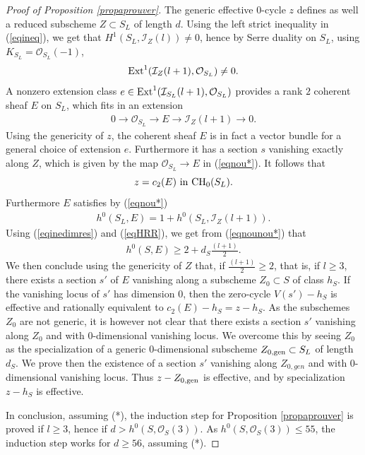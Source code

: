 \documentclass[10pt]{article}
\begin{document}
\begin{proof}[Proof of Proposition \ref{propaprouver}]
The generic effective $0$-cycle $z$ defines as well a reduced subscheme
$Z\subset S_L$ of length $d$. Using the left strict inequality in (\ref{eqineq}), we get that $H^1(S_L,\mathcal{I}_Z(l))\not=0$, hence by Serre duality on $S_L$, using $K_{S_L}=\mathcal{O}_{S_L}(-1)$,
$${\rm Ext}^1(\mathcal{I}_Z(l+1),\mathcal{O}_{S_L})\not=0.$$
A nonzero  extension class
$e\in {\rm Ext}^1(\mathcal{I}_{S_L}(l+1),\mathcal{O}_{S_L})$ provides a rank $2$ coherent sheaf
$E$ on $S_L$, which fits in an extension
\begin{eqnarray}\label{eqnou*}0\rightarrow \mathcal{O}_{S_L}\rightarrow E\rightarrow \mathcal{I}_{Z}(l+1)\rightarrow 0.\end{eqnarray}
Using the genericity of $z$, the coherent sheaf $E$ is in fact a vector bundle for a general choice of extension $e$. Furthermore it  has a section $s$ vanishing exactly along $Z$, which is given by the map $\mathcal{O}_{S_L}\rightarrow E$ in (\ref{eqnou*}). It follows that
$$z=c_2(E)\,\,{\rm in}\,\,{\rm CH}_0(S_L).$$
 Furthermore $E$  satisfies by (\ref{eqnou*})
\begin{eqnarray}\label{eqnounou*}h^0(S_L,E)=1+h^0(S_L,\mathcal{I}_Z(l+1)).\end{eqnarray}
Using (\ref{eqinedimres}) and (\ref{eqHRR}), we get from (\ref{eqnounou*}) that
\begin{eqnarray}\label{eqineqpourhzeroE} h^0(S,E)\geq 2+d_S\frac{(l+1)}{2}.
\end{eqnarray}
We then conclude using the genericity of $Z$ that, if $\frac{(l+1)}{2}\geq 2$, that is, if $l\geq 3$, there exists a section $s'$  of $E$  vanishing along a  subscheme $Z_0\subset S$ of class $h_S$.
If the vanishing locus of $s'$ has dimension $0$, then
the zero-cycle $V(s')-h_S$ is effective and rationally equivalent to $c_2(E)-h_S=z-h_S$. As the subschemes $Z_0$ are not generic, it is however not clear that there exists a section $s'$ vanishing along $Z_0$ and with $0$-dimensional vanishing locus. We overcome this by seeing $Z_0$ as the specialization of a generic $0$-dimensional subscheme
$Z_{0,{\rm gen}}\subset S_L$ of length $d_S$. We prove then the existence of a section $s'$ vanishing along $Z_{0,gen}$ and with $0$-dimensional vanishing locus. Thus $z-Z_{0,{\rm gen}}$ is effective, and by specialization $z-h_S$ is effective.

 In conclusion,  assuming (*), the induction step for Proposition \ref{propaprouver} is proved if  $l\geq 3$, hence if $d> h^0(S,\mathcal{O}_S(3))$. As $h^0(S,\mathcal{O}_S(3))\leq 55$, the induction step works for $d\geq 56$, assuming (*).


\end{proof}
\end{document}

